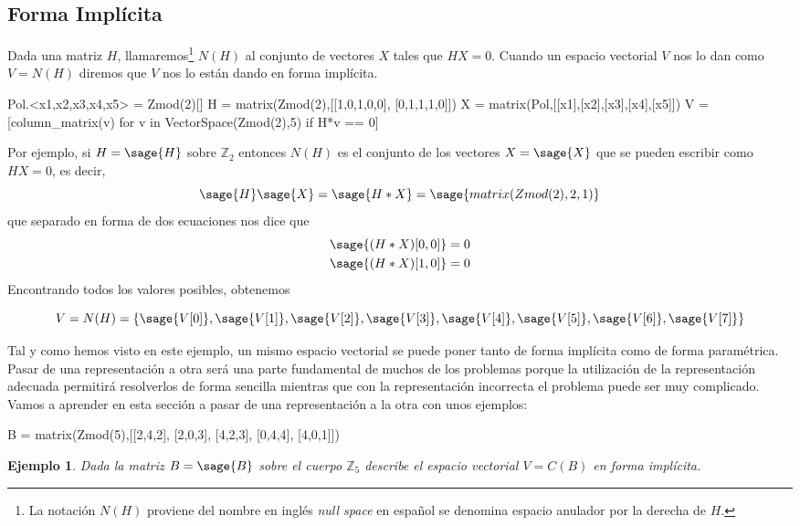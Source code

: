 \documentclass{amsart}
\newtheorem{ejem}{Ejemplo}
\begin{document}
\subsection{Forma Implícita} Dada una matriz $H$, llamaremos\footnote{La
notación $N(H)$ proviene del nombre en inglés {\it null space} en español
se denomina espacio anulador por la derecha de $H$.} $N(H)$ al conjunto
de vectores $X$ tales que $HX = 0$. Cuando un espacio vectorial $V$ nos lo
dan como $V = N(H)$ diremos que $V$ nos lo están dando en forma implícita.

\begin{sagecode}
Pol.<x1,x2,x3,x4,x5> = Zmod(2)[]
H = matrix(Zmod(2),[[1,0,1,0,0],
[0,1,1,1,0]])
X = matrix(Pol,[[x1],[x2],[x3],[x4],[x5]])
V = [column_matrix(v) for v in VectorSpace(Zmod(2),5) if H*v == 0]
\end{sagecode}

Por ejemplo, si $H = \sage{H}$ sobre ${\mathbb Z}_2$ entonces
$N(H)$ es el conjunto de los vectores $X = \sage{X}$ que se pueden escribir
como $HX = 0$, es decir, 
$$ \sage{H} \sage{X} = \sage{H*X} = \sage{matrix(Zmod(2),2,1)}$$
que separado en forma de dos ecuaciones nos dice que
\begin{align*} 
\sage{(H*X)[0,0]} &= 0 \\
\sage{(H*X)[1,0]} &= 0 \\
\end{align*}
Encontrando todos los valores posibles, obtenemos

$$V = N(H) = \left\{ \sage{V[0]},\sage{V[1]},\sage{V[2]},\sage{V[3]},
\sage{V[4]},\sage{V[5]},\sage{V[6]},\sage{V[7]}\right\}$$  

\vspace{1cm}

Tal y como hemos visto en este ejemplo, un mismo espacio vectorial se puede
poner tanto de forma implícita como de forma paramétrica. Pasar de una 
representación a otra será una parte fundamental de muchos de los problemas
porque la utilización de la representación adecuada permitirá resolverlos
de forma sencilla mientras que con la representación incorrecta el problema
puede ser muy complicado. Vamos a aprender en esta sección a pasar de una
representación a la otra con unos ejemplos:

\begin{sagecode}
B = matrix(Zmod(5),[[2,4,2],
[2,0,3],
[4,2,3],
[0,4,4],
[4,0,1]])
\end{sagecode}

\begin{ejem}
Dada la matriz $B = \sage{B}$ sobre el cuerpo ${\mathbb Z}_5$ describe el 
espacio vectorial $V = C(B)$ en forma implícita.
\end{ejem}
\end{document}
